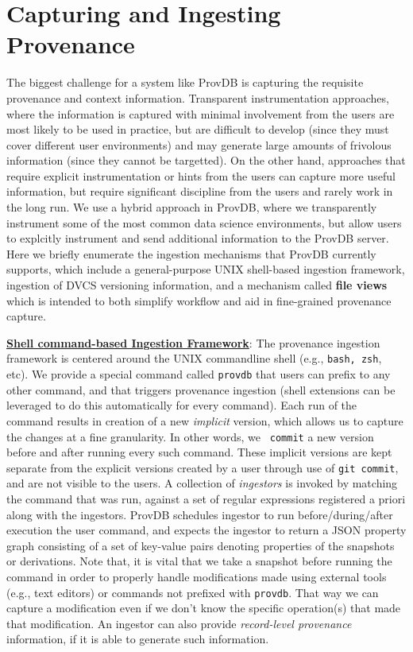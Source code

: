 \documentclass[11pt]{article}
\newcommand{\provdb}{{\sc ProvDB}\xspace}
\newcommand{\topic}[1]{\vspace{3pt}\noindent\underline{\bf #1}}
\begin{document}
\section{Capturing and Ingesting Provenance}
\label{sec:ingestion}
The biggest challenge for a system like \provdb is capturing the requisite provenance and context information. Transparent instrumentation approaches, where the
information is captured with minimal involvement from the users are most likely to be used in practice, but are difficult to develop (since they must cover different
user environments) and may generate large amounts of frivolous information (since they cannot be targetted). On the other hand, approaches that require explicit
instrumentation or hints from the users can capture more useful information, but require significant discipline from the users and rarely work in the long run. 
We use a hybrid approach in \provdb, where we transparently instrument some of the most common data science environments, but allow users to explcitly instrument and
send additional information to the \provdb server.
Here we briefly enumerate the ingestion mechanisms that \provdb currently supports, which include a general-purpose UNIX shell-based ingestion framework, ingestion of
DVCS versioning information, and a mechanism called {\bf file views} which is intended to both simplify workflow and aid in fine-grained provenance capture. 

\topic{Shell command-based Ingestion Framework}: 
The provenance ingestion framework is centered around the UNIX commandline shell (e.g., {\tt bash, zsh}, etc). We provide a special command called {\tt provdb} that
users can prefix to any other command, and that triggers provenance ingestion (shell extensions can be leveraged to do this automatically for every command). 
Each run of the command results in creation of a new {\em implicit} version, which allows us to capture the changes at a fine granularity. In other words, we {\tt
commit} a new version before and after running every such command. These implicit versions are kept separate from the explicit versions created by a user through
use of {\tt git commit}, and are not visible to the users. A collection of {\em ingestors} is invoked by matching the command that was run, against a set of regular
expressions registered a priori along with the ingestors. \provdb schedules ingestor to run before/during/after execution the user command, and expects the ingestor
to return a JSON property graph consisting of a set of key-value pairs denoting properties of the snapshots or derivations. 
Note that, it is vital that we take a snapshot before running the command in order to properly handle modifications made using external tools (e.g., text editors) or
commands not prefixed with {\tt provdb}. That way we can capture a modification even if we don't know the specific operation(s) that made that modification.
An ingestor can also provide {\em record-level provenance} information, if it is able to generate such information. 
\end{document}
